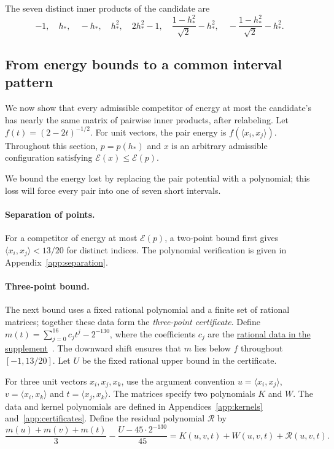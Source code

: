 \documentclass[11pt]{article}
\newcommand{\E}{\mathcal{E}}
\begin{document}
The seven distinct inner products of the candidate are
\[
 -1,\quad h_*,\quad-h_*,\quad h_*^2,\quad2h_*^2-1,\quad
 \frac{1-h_*^2}{\sqrt2}-h_*^2,\quad
 -\frac{1-h_*^2}{\sqrt2}-h_*^2.
\]
\subsection{From energy bounds to a common interval pattern}\label{sec:global}
We now show that every admissible competitor of energy at most the
candidate's has nearly the same matrix of pairwise inner products, after
relabeling. Let $f(t)=(2-2t)^{-1/2}$. For unit vectors, the pair energy is
$f(\langle x_i,x_j\rangle)$. Throughout this section, $p=p(h_*)$ and
$x$ is an arbitrary admissible configuration satisfying $\E(x)\leq\E(p)$.

We bound the energy lost by replacing the pair potential with a polynomial;
this loss will force every pair into one of seven short intervals.
\paragraph{Separation of points.}
For a competitor of energy at most $\E(p)$, a two-point bound first gives
$\langle x_i,x_j\rangle<13/20$ for distinct indices.
The polynomial verification is given in Appendix~\ref{app:separation}.

\paragraph{Three-point bound.}
The next bound uses a fixed rational polynomial and a finite set of
rational matrices; together these data form the \emph{three-point
certificate}. Define
$m(t)=\sum_{j=0}^{16}c_jt^j-2^{-130}$, where the coefficients $c_j$ are the \href{https://github.com/6/clank-lab/tree/e987408cf2d4c27c6e0c10d9f1a522ce3156c632/results/thomson-10}{rational data in the supplement}~\cite{supplement}. The downward
shift ensures that $m$ lies below $f$ throughout $[-1,13/20]$.
Let $U$ be the fixed rational upper bound in the certificate.

For three unit vectors $x_i,x_j,x_k$, use the argument convention
$u=\langle x_i,x_j\rangle$, $v=\langle x_i,x_k\rangle$ and
$t=\langle x_j,x_k\rangle$. The matrices specify two polynomials $K$
and $W$. The data and kernel polynomials are defined in
Appendices~\ref{app:kernels} and~\ref{app:certificates}. Define the residual polynomial $\mathcal R$ by
\[
 \frac{m(u)+m(v)+m(t)}3-\frac{U-45\cdot2^{-130}}{45}
   =K(u,v,t)+W(u,v,t)+\mathcal R(u,v,t).
\]
\end{document}
